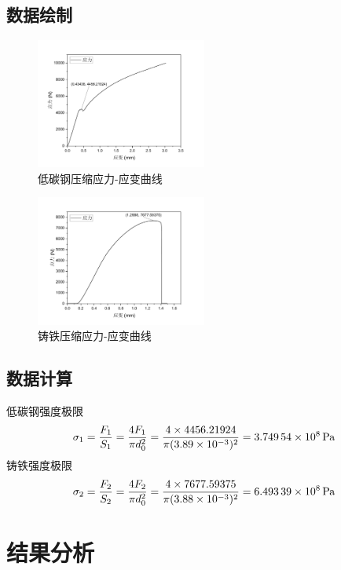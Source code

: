     \subsection{数据绘制}
    \begin{figure}[!ht]
        \caption{低碳钢压缩应力-应变曲线}
        \includegraphics[width=0.5\textwidth]{img/A6/steelPush.pdf}
    \end{figure}
    \begin{figure}[!ht]
        \caption{铸铁压缩应力-应变曲线}
        \includegraphics[width=0.5\textwidth]{img/A6/ironPush.pdf}
    \end{figure}

    \subsection{数据计算}
    \noindent 低碳钢强度极限
    \begin{equation}
        \sigma_1=\frac{F_1}{S_{1}}=\frac{4 F_1}{\pi d_{0}^2}=\frac{4\times 4456.21924}{\pi(3.89\times 10^{-3})^{2}}=\SI{3.74954d8}{\Pa}
    \end{equation}
    铸铁强度极限
    \begin{equation}
        \sigma_2=\frac{F_2}{S_{2}}=\frac{4 F_2}{\pi d_{0}^2}=\frac{4\times  7677.59375}{\pi(3.88\times 10^{-3})^{2}}=\SI{6.49339d8}{\Pa}
    \end{equation}
\section{结果分析}
